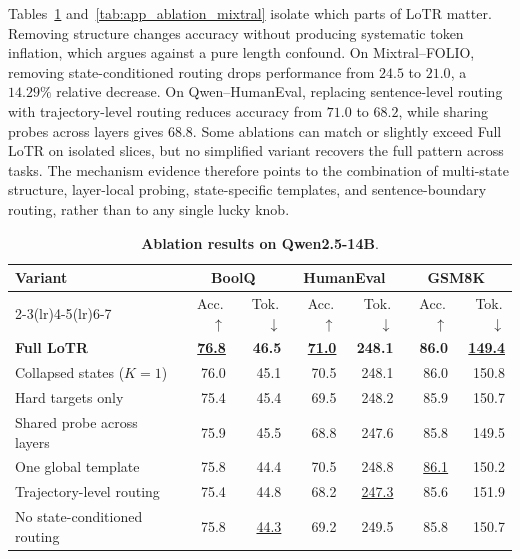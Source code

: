 Tables~\ref{tab:app_ablation_qwen} and~\ref{tab:app_ablation_mixtral} isolate which parts of LoTR matter. Removing structure changes accuracy without producing systematic token inflation, which argues against a pure length confound. On Mixtral--FOLIO, removing state-conditioned routing drops performance from \(24.5\) to \(21.0\), a \(14.29\%\) relative decrease. On Qwen--HumanEval, replacing sentence-level routing with trajectory-level routing reduces accuracy from \(71.0\) to \(68.2\), while sharing probes across layers gives \(68.8\). Some ablations can match or slightly exceed Full LoTR on isolated slices, but no simplified variant recovers the full pattern across tasks. The mechanism evidence therefore points to the combination of multi-state structure, layer-local probing, state-specific templates, and sentence-boundary routing, rather than to any single lucky knob.

\begin{table}[!t]
\centering
\caption{\textbf{Ablation results on Qwen2.5-14B}.}
\label{tab:app_ablation_qwen}
\vspace{-2mm}
\small
\setlength{\tabcolsep}{3pt}
\renewcommand{\arraystretch}{1.02}
\begin{tabular}{@{}p{4.74cm}rrrrrr@{}}
\toprule
\multirow{2}{*}[-2pt]{\textbf{Variant}} & \multicolumn{2}{c}{\textbf{BoolQ}} & \multicolumn{2}{c}{\textbf{HumanEval}} & \multicolumn{2}{c}{\textbf{GSM8K}} \\
\cmidrule(lr){2-3}\cmidrule(lr){4-5}\cmidrule(lr){6-7}
& Acc.\,$\uparrow$ & Tok.\,$\downarrow$ & Acc.\,$\uparrow$ & Tok.\,$\downarrow$ & Acc.\,$\uparrow$ & Tok.\,$\downarrow$ \\
\midrule
\cellcolor{cyan!10}\textbf{Full LoTR} & \cellcolor{cyan!10}\textbf{\underline{76.8}} & \cellcolor{cyan!10}\textbf{46.5} & \cellcolor{cyan!10}\textbf{\underline{71.0}} & \cellcolor{cyan!10}\textbf{248.1} & \cellcolor{cyan!10}\textbf{86.0} & \cellcolor{cyan!10}\textbf{\underline{149.4}} \\
Collapsed states ($K{=}1$) & 76.0 & 45.1 & 70.5 & 248.1 & 86.0 & 150.8 \\
Hard targets only & 75.4 & 45.4 & 69.5 & 248.2 & 85.9 & 150.7 \\
Shared probe across layers & 75.9 & 45.5 & 68.8 & 247.6 & 85.8 & 149.5 \\
One global template & 75.8 & 44.4 & 70.5 & 248.8 & \underline{86.1} & 150.2 \\
Trajectory-level routing & 75.4 & 44.8 & 68.2 & \underline{247.3} & 85.6 & 151.9 \\
No state-conditioned routing & 75.8 & \underline{44.3} & 69.2 & 249.5 & 85.8 & 150.7 \\
\bottomrule
\end{tabular}%
\vspace{-2mm}
\end{table}


